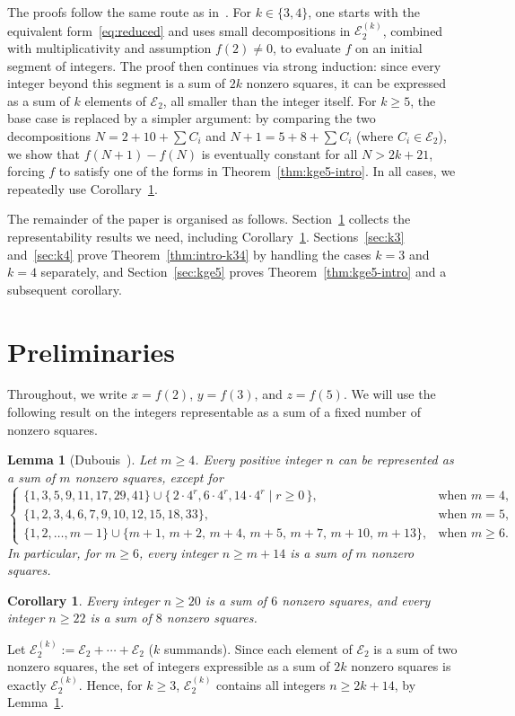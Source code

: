 \documentclass[11pt,a4paper]{amsart}
\newcommand{\E}{\mathcal{E}}
\theoremstyle{plain}
\newtheorem{corollary}[theorem]{Corollary}
\newtheorem{lemma}[theorem]{Lemma}
\theoremstyle{definition}
\begin{document}
The proofs follow the same route as in~\cite{ParkTwoSquares}. For $k\in\{3,4\}$, one starts with the equivalent form~\eqref{eq:reduced} and uses small decompositions in $\E_2^{(k)}$, combined with multiplicativity and assumption $f(2)\neq0$, to evaluate $f$ on an initial segment of integers. The proof then continues via strong induction: since every integer beyond this segment is a sum of $2k$ nonzero squares, it can be expressed as a sum of $k$ elements of $\E_2$, all smaller than the integer itself. For $k\ge 5$, the base case is replaced by a simpler argument: by comparing the two decompositions $N=2+10+\sum C_i$ and $N+1=5+8+\sum C_i$ (where $C_i \in \E_2$), we show that $f(N+1)-f(N)$ is eventually constant for all $N>2k+21$, forcing $f$ to satisfy one of the forms in Theorem~\ref{thm:kge5-intro}. In all cases, we repeatedly use Corollary~\ref{cor:6sqand8sq}.


The remainder of the paper is organised as follows. Section~\ref{sec:prelim} collects the representability results we need, including Corollary~\ref{cor:6sqand8sq}.
Sections~\ref{sec:k3} and~\ref{sec:k4} prove Theorem~\ref{thm:intro-k34} by handling the cases $k=3$ and $k=4$ separately, and Section~\ref{sec:kge5} proves Theorem~\ref{thm:kge5-intro} and a subsequent corollary.



\section{Preliminaries}\label{sec:prelim}
Throughout, we write $x = f(2)$, $y = f(3)$, and $z = f(5)$. We will use the following result on the integers representable as a sum of a fixed number of nonzero squares.
\begin{lemma}[Dubouis~\cite{Dubouis1911}]\label{thm:dubouis}
Let $m \ge 4$. Every positive integer $n$ can be represented as a sum of $m$ nonzero squares, except for
\[
 \begin{cases} 
        \{1,3,5,9,11,17,29,41\}\cup\{\, 2\cdot 4^r, 6\cdot 4^r, 14\cdot 4^r \mid r \ge 0 \, \}, & \text{when } m = 4, \\
        \{1,2,3,4,6,7,9,10,12,15,18,33\}, & \text{when } m = 5, \\
        \{1,2,\dots,m-1\}\cup\{m+1,\,m+2,\,m+4,\,m+5,\,m+7,\,m+10,\,m+13\}, & \text{when } m \ge 6.
    \end{cases}
\]
In particular, for $m \ge 6$, every integer $n \ge m + 14$ is a sum of $m$ nonzero squares.
\end{lemma}
\begin{corollary}\label{cor:6sqand8sq}
Every integer $n \ge 20$ is a sum of $6$ nonzero squares, and every integer
$n \ge 22$ is a sum of $8$ nonzero squares.
\end{corollary}
Let $\E_{2}^{(k)} := \E_2 + \cdots + \E_2$ ($k$ summands). Since each element of $\E_2$ is a sum of two nonzero squares, the set of integers expressible as a sum of $2k$ nonzero squares is exactly $\E_{2}^{(k)}$. Hence, for $k \ge 3$, $\E_{2}^{(k)}$ contains all integers $n \ge 2k+14$, by Lemma~\ref{thm:dubouis}.
\end{document}
